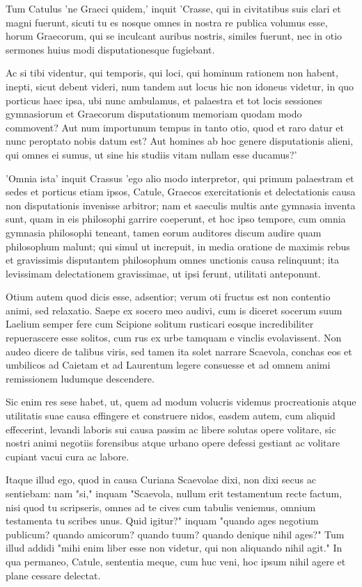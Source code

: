  Tum Catulus 'ne Graeci quidem,' inquit 'Crasse, qui in civitatibus suis clari et magni fuerunt, sicuti tu es nosque omnes in nostra re publica volumus esse, horum Graecorum, qui se inculcant auribus nostris, similes fuerunt, nec in otio sermones huius modi disputationesque fugiebant.

 Ac si tibi videntur, qui temporis, qui loci, qui hominum rationem non habent, inepti, sicut debent videri, num tandem aut locus hic non idoneus videtur, in quo porticus haec ipsa, ubi nunc ambulamus, et palaestra et tot locis sessiones gymnasiorum et Graecorum disputationum memoriam quodam modo commovent? Aut num importunum tempus in tanto otio, quod et raro datur et nunc peroptato nobis datum est? Aut homines ab hoc genere disputationis alieni, qui omnes ei sumus, ut sine his studiis vitam nullam esse ducamus?'

 'Omnia ista' inquit Crassus 'ego alio modo interpretor, qui primum palaestram et sedes et porticus etiam ipsos, Catule, Graecos exercitationis et delectationis causa non disputationis invenisse arbitror; nam et saeculis multis ante gymnasia inventa sunt, quam in eis philosophi garrire coeperunt, et hoc ipso tempore, cum omnia gymnasia philosophi teneant, tamen eorum auditores discum audire quam philosophum malunt; qui simul ut increpuit, in media oratione de maximis rebus et gravissimis disputantem philosophum omnes unctionis causa relinquunt; ita levissimam delectationem gravissimae, ut ipsi ferunt, utilitati anteponunt.

 Otium autem quod dicis esse, adsentior; verum oti fructus est non contentio animi, sed relaxatio. Saepe ex socero meo audivi, cum is diceret socerum suum Laelium semper fere cum Scipione solitum rusticari eosque incredibiliter repuerascere esse solitos, cum rus ex urbe tamquam e vinclis evolavissent. Non audeo dicere de talibus viris, sed tamen ita solet narrare Scaevola, conchas eos et umbilicos ad Caietam et ad Laurentum legere consuesse et ad omnem animi remissionem ludumque descendere.

 Sic enim res sese habet, ut, quem ad modum volucris videmus procreationis atque utilitatis suae causa effingere et construere nidos, easdem autem, cum aliquid effecerint, levandi laboris sui causa passim ac libere solutas opere volitare, sic nostri animi negotiis forensibus atque urbano opere defessi gestiant ac volitare cupiant vacui cura ac labore.

 Itaque illud ego, quod in causa Curiana Scaevolae dixi, non dixi secus ac sentiebam: nam "si," inquam "Scaevola, nullum erit testamentum recte factum, nisi quod tu scripseris, omnes ad te cives cum tabulis veniemus, omnium testamenta tu scribes unus. Quid igitur?" inquam "quando ages negotium publicum? quando amicorum? quando tuum? quando denique nihil ages?" Tum illud addidi "mihi enim liber esse non videtur, qui non aliquando nihil agit." In qua permaneo, Catule, sententia meque, cum huc veni, hoc ipsum nihil agere et plane cessare delectat.

